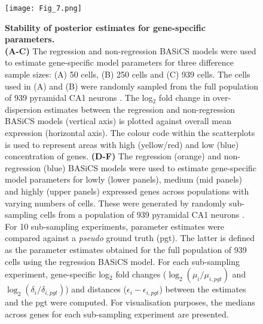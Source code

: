 \begin{figure}[!h]
\centering
\texttt{[image: Fig\_7.png]}
\caption[Stability of posterior estimates for gene-specific parameters]{\textbf{Stability of posterior estimates for gene-specific parameters.}\\
\textbf{(A-C)} The regression and non-regression BASiCS models were used to estimate gene-specific model parameters for three difference sample sizes: (A) 50 cells, (B) 250 cells and (C) 939 cells. The cells used in (A) and (B) were randomly sampled from the full population of 939 pyramidal CA1 neurons \citep{Zeisel2015}. The log$_2$ fold change in over-dispersion estimates between the regression and non-regression BASiCS models (vertical axis) is plotted against overall mean expression (horizontal axis). The colour code within the scatterplots is used to represent areas with high (yellow/red) and low (blue) concentration of genes. \textbf{(D-F)} The regression (orange) and non-regression (blue) BASiCS models were used to estimate gene-specific model parameters for lowly (lower panels), medium (mid panels) and highly (upper panels) expressed genes across populations with varying numbers of cells. These were generated by randomly sub-sampling cells from a population of 939 pyramidal CA1 neurons \citep{Zeisel2015}. For 10 sub-sampling experiments, parameter estimates were compared against a \textit{pseudo} ground truth (pgt). The latter is defined as the parameter estimates obtained for the full population of 939 cells using the regression BASiCS model. For each sub-sampling experiment, gene-specific log$_2$ fold changes ($\log_2(\mu_i/\mu_{i,pgt})$ and $\log_2(\delta_i/\delta_{i,pgt})$) and distances ($\epsilon_i - \epsilon_{i,pgt}$) between the estimates and the pgt were computed. For visualisation purposes, the medians across genes for each sub-sampling experiment are presented. }
\label{fig2:parameter_stabilization2}
\end{figure}

\newpage

\captionsetup[figure]{list=no}
\addtocounter{figure}{-1}   
\captionsetup[figure]{list=yes}

